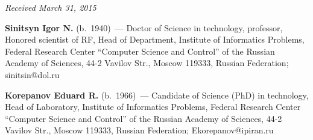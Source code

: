 \vspace*{-3pt}



\hfill{\small\textit{Received March 31, 2015}}








\Contr



\noindent

\textbf{Sinitsyn Igor N.} (b.\ 1940)~--- Doctor of Science in technology, professor, Honored scientist of RF, Head of Department, Institute of Informatics Problems, Federal Research Center ``Computer Science and Control'' of the Russian Academy of Sciences, 44-2 Vavilov Str., Moscow 119333, Russian Federation; sinitsin@dol.ru



\vspace*{3pt}



\noindent

\textbf{Korepanov Eduard R.} (b.\ 1966)~--- Candidate of Science (PhD) in technology, Head of Laboratory, Institute of Informatics Problems, Federal Research Center ``Computer Science and Control'' of the Russian Academy of Sciences, 44-2 Vavilov Str., Moscow 119333, Russian Federation; Ekorepanov@ipiran.ru



\label{end\stat}





\renewcommand{\bibname}{\protect\rm Литература} 